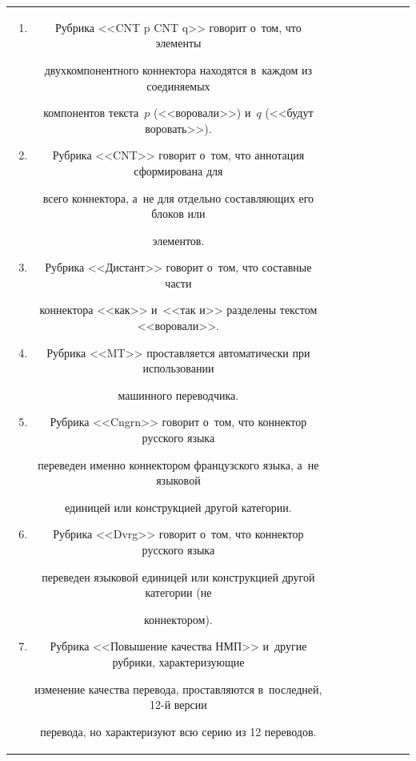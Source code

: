 \begin{table}
\begin{center}
\begin{tabular}{|c|c|l|l|l|l|c|c|}
{\begin{enumerate}[1.]
{и} выражает ло\-ги\-ко-се\-ман\-ти\-че\-ское отношение аналогии.


\vspace*{-3pt}


\item Рубрика <<CNT p CNT q>> говорит о~том, что элементы 


двухкомпонентного коннектора находятся в~каждом из соединяемых 


компонентов текста~$p$ (<<воровали>>) и~$q$ (<<будут воровать>>).\vspace*{-3pt}


\item Рубрика <<CNT>> говорит о~том, что аннотация сформирована для 


всего коннектора, а~не для отдельно составляющих его блоков или 


элементов.\vspace*{-3pt}


\item Рубрика <<Дистант>> говорит о~том, что составные части 


коннектора <<как>> и~<<так и>> разделены текстом <<воровали>>.\vspace*{-3pt}


\item Рубрика <<MT>> проставляется автоматически при использовании 


машинного переводчика.\vspace*{-3pt}


\item Рубрика <<Cngrn>> говорит о~том, что коннектор русского языка 


переведен именно коннектором французского языка, а~не языковой 


единицей или конструкцией другой категории.\vspace*{-3pt}


\item Рубрика <<Dvrg>> говорит о~том, что коннектор русского языка 


переведен языковой единицей или конструкцией другой категории (не 


коннектором).\vspace*{-3pt}


\item Рубрика <<Повышение качества НМП>> и~другие рубрики, характеризующие 


изменение качества перевода, проставляются в~последней, 12-й версии 


перевода, но характеризуют всю серию из 12 переводов.


\end{enumerate}}


\end{tabular}


\vspace*{-14.1pt}


\end{center}


\vspace*{-3pt}


\end{table}
